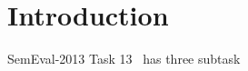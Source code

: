 \section{Introduction}
\label{sec:introduction}

SemEval-2013 Task 13~\cite{jurgens2013semeval} has three subtask
